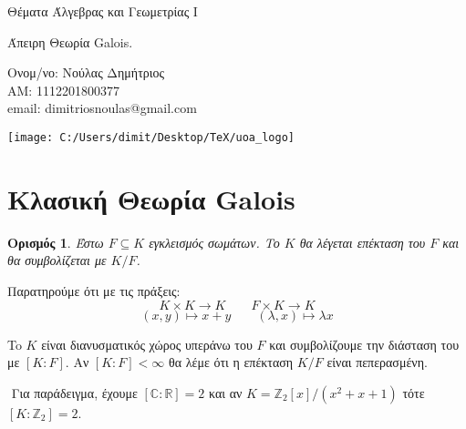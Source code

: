\documentclass[oneside,a4paper]{article}
\newtheorem*{defn}{Ορισμός}
\newcommand {\tl}{\textlatin}
\newcommand{\Z}{\mathbb{Z}}
\begin{document}
	
	
	\begin{framed}	
		\begin{center}
			\huge Θέματα Άλγεβρας και Γεωμετρίας \tl{I}
		\end{center}
		\begin{center}
			\huge Άπειρη Θεωρία \tl{Galois}.
		\end{center}
		\vspace{0.3truecm}
		\begin{center}
			Ονομ/νο: Νούλας Δημήτριος\\
			ΑΜ: 1112201800377\\
			\tl{email}: \tl{dimitriosnoulas@gmail.com}
		\end{center}
		\vspace{0.3truecm}
	\end{framed}
	\vspace*{\fill}
	\begin{center}
	\texttt{[image: C:/Users/dimit/Desktop/TeX/uoa\_logo]}
	\end{center}
\vspace{1cm}
\pagebreak
\tableofcontents
\pagebreak
\section{Κλασική Θεωρία \tl{Galois}}
\vspace{1cm}

\begin{defn}
	Έστω $F\subseteq K$ εγκλεισμός σωμάτων. Το $K$ θα λέγεται επέκταση του $F$ και θα συμβολίζεται με $K/F$.
\end{defn}

Παρατηρούμε ότι με τις πράξεις:
$$K\times K \longrightarrow K \quad\quad F \times K \longrightarrow K$$
$$(x,y) \longmapsto x+y \quad\quad (\lambda, x) \longmapsto \lambda x$$

To $K$ είναι διανυσματικός χώρος υπεράνω του $F$ και συμβολίζουμε την διάσταση του με $[K:F]$. Αν $[K:F]<\infty$ θα λέμε ότι η επέκταση $K/F$ είναι πεπερασμένη.

$ $\newline
Για παράδειγμα, έχουμε $[\mathbb C : \mathbb R] = 2$ και αν $K = \Z_2 [x]/(x^2 + x + 1)$ τότε $[K:\Z_2] = 2$.
\end{document}
